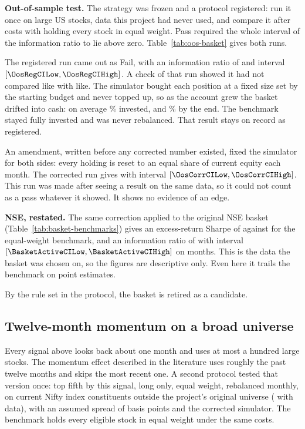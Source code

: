 \textbf{Out-of-sample test.} The strategy was frozen and a protocol registered: run it once on \OosSymbols{} large US stocks, data this project had never used, and compare it after costs with holding every stock in equal weight. Pass required the whole interval of the information ratio to lie above zero. Table~\ref{tab:oos-basket} gives both runs.

The registered run came out as Fail, with an information ratio of \OosRegIR{} and interval $[\OosRegCILow, \OosRegCIHigh]$. A check of that run showed it had not compared like with like. The simulator bought each position at a fixed size set by the starting budget and never topped up, so as the account grew the basket drifted into cash: on average \OosRegInvestedMean\% invested, and \OosRegInvestedEnd\% by the end. The benchmark stayed fully invested and was never rebalanced. That result stays on record as registered.

An amendment, written before any corrected number existed, fixed the simulator for both sides: every holding is reset to an equal share of current equity each month. The corrected run gives \OosCorrIR{} with interval $[\OosCorrCILow, \OosCorrCIHigh]$. This run was made after seeing a result on the same data, so it could not count as a pass whatever it showed. It shows no evidence of an edge.



\textbf{NSE, restated.} The same correction applied to the original NSE basket (Table~\ref{tab:basket-benchmarks}) gives an excess-return Sharpe of \BasketSharpeExcess{} against \EqualWeightSharpeExcess{} for the equal-weight benchmark, and an information ratio of \BasketActiveIR{} with interval $[\BasketActiveCILow, \BasketActiveCIHigh]$ on \BasketPeriods{} months. This is the data the basket was chosen on, so the figures are descriptive only. Even here it trails the benchmark on point estimates.



By the rule set in the protocol, the basket is retired as a candidate.

\subsection{Twelve-month momentum on a broad universe}
Every signal above looks back about one month and uses at most a hundred large stocks. The momentum effect described in the literature uses roughly the past twelve months and skips the most recent one. A second protocol tested that version once: top fifth by this signal, long only, equal weight, rebalanced monthly, on current Nifty index constituents outside the project's original universe (\MomSymbols{} with data), with an assumed spread of \MomSpreadBps{} basis points and the corrected simulator. The benchmark holds every eligible stock in equal weight under the same costs.

